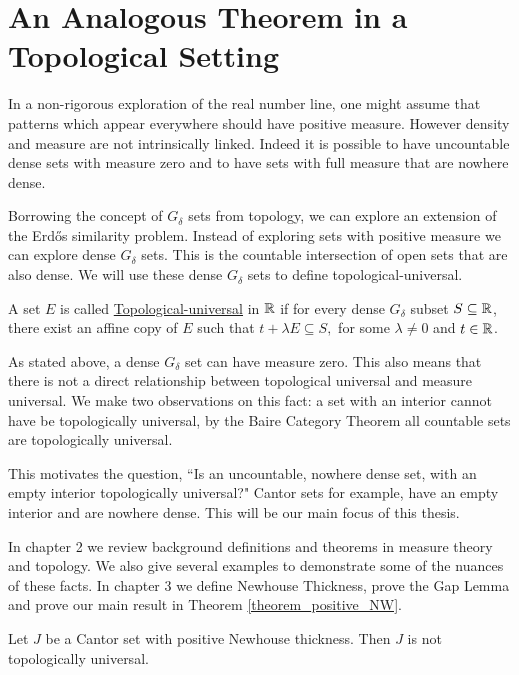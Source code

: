 \section{An Analogous Theorem in a Topological Setting}

In a non-rigorous exploration of the real number line, one might assume that patterns which appear everywhere should have positive measure.  However density and measure are not intrinsically linked.  Indeed it is possible to have uncountable dense sets with measure zero and to have sets with full measure that are nowhere dense.  

Borrowing the concept of $G_\delta$ sets from topology, we can explore an extension of the Erd\H{o}s similarity problem.  Instead of exploring sets with positive measure we can explore dense $G_\delta$ sets.  This is the countable intersection of open sets that are also dense.  We will use these dense $G_\delta$ sets to define topological-universal. 

\begin{definition}
    A set $E$ is called \underline{Topological-universal} in $\mathbb{R}$ if for every dense $G_\delta$ subset $S \subseteq \mathbb{R}$, there exist an affine copy of $E$ such that $t+\lambda E \subseteq S,$ for some $\lambda \neq 0$ and $t \in \mathbb{R}$.  
\end{definition}

As stated above, a dense $G_\delta$ set can have measure zero.  This also means that there is not a direct relationship between topological universal and measure universal.  We make two observations on this fact: a set with an interior cannot have be topologically universal, by the Baire Category Theorem all countable sets are topologically universal.   

This motivates the question, ``Is an uncountable, nowhere dense set, with an empty interior topologically universal?"  Cantor sets for example, have an empty interior and are nowhere dense. This will be our main focus of this thesis. 

In chapter 2 we review background definitions and theorems in measure theory and topology.  We also give several examples to demonstrate some of the nuances of these facts.  In chapter 3 we define Newhouse Thickness, prove the Gap Lemma and prove our main result in Theorem \ref{theorem_positive_NW}.

\begin{theorem*}
Let $J$ be a Cantor set with positive Newhouse thickness.  Then $J$ is not topologically universal.
\end{theorem*}

